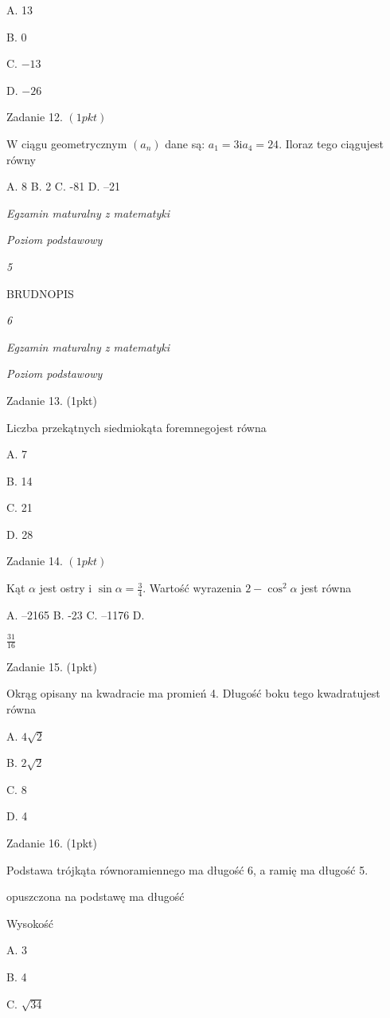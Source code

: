\documentclass[a4paper,12pt]{article}
\begin{document}
A. 13

B. 0

C. $-13$

D. $-26$

Zadanie 12. $(1pkt)$

$\mathrm{W}$ ciągu geometrycznym $(a_{n})$ dane są: $a_{1}=3\mathrm{i}a_{4}=24$. Iloraz tego ciągujest równy

A. 8 B. 2 C. -81 D. --21





{\it Egzamin maturalny z matematyki}

{\it Poziom podstawowy}

{\it 5}

BRUDNOPIS





{\it 6}

{\it Egzamin maturalny z matematyki}

{\it Poziom podstawowy}

Zadanie 13. (1pkt)

Liczba przekątnych siedmiokąta foremnegojest równa

A. 7

B. 14

C. 21

D. 28

Zadanie 14. $(1pkt)$

Kąt $\alpha$ jest ostry i $\displaystyle \sin\alpha=\frac{3}{4}$. Wartość wyrazenia $ 2-\cos^{2}\alpha$ jest równa

A. --2165 B. -23 C. --1176 D.

$\displaystyle \frac{31}{16}$

Zadanie 15. (1pkt)

Okrąg opisany na kwadracie ma promień 4. Długość boku tego kwadratujest równa

A. $4\sqrt{2}$

B. $2\sqrt{2}$

C. 8

D. 4

Zadanie 16. (1pkt)

Podstawa trójkąta równoramiennego ma długość 6, a ramię ma długość 5.

opuszczona na podstawę ma długość

Wysokość

A. 3

B. 4

C. $\sqrt{34}$
\end{document}

